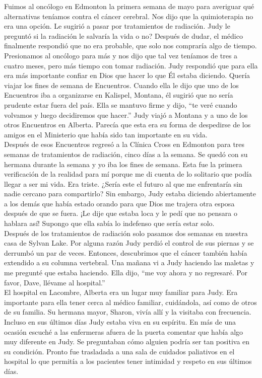\documentclass[twoside, 12pt]{book}
\begin{document}
Fuimos al oncólogo en Edmonton la primera semana de mayo para averiguar qué alternativas teníamos contra el cáncer cerebral. Nos dijo que la quimioterapia no era una opción. Le sugirió a pasar por tratamientos de radiación. Judy le preguntó si la radiación le salvaría la vida o no? Después de dudar, el médico finalmente respondió que no era probable, que solo nos compraría algo de tiempo. Presionamos al oncólogo para más y nos dijo que tal vez teníamos de tres a cuatro meses, pero más tiempo con tomar radiación. Judy respondió que para ella era más importante confiar en Dios que hacer lo que Él estaba diciendo. Quería viajar los fines de semana de Encuentros. Cuando ella le dijo que uno de los Encuentros iba a organizarse en Kalispel, Montana, él sugirió que no sería prudente estar fuera del país. Ella se mantuvo firme y dijo, “te veré cuando volvamos y luego decidiremos que hacer.” Judy viajó a Montana y a uno de los otros Encuentros en Alberta. Parecía que esta era su forma de despedirse de los amigos en el Ministerio que había sido tan importante en su vida.\\
 
Después de esos Encuentros regresó a la Clínica Cross en Edmonton para tres semanas de tratamientos de radiación, cinco días a la semana. Se quedó con su hermana durante la semana y yo iba los fines de semana. Esta fue la primera verificación de la realidad para mí porque me di cuenta de lo solitario que podía llegar a ser mi vida. Era triste. ¿Sería este el futuro al que me enfrentaría sin nadie cercano para compartirlo? Sin embargo, Judy estaba diciendo abiertamente a los demás que había estado orando para que Dios me trajera otra esposa después de que se fuera. ¡Le dije que estaba loca y le pedí que no pensara o hablara así!  Supongo que ella sabía lo indefenso que sería estar solo.\\
 
Después de los tratamientos de radiación solo pasamos dos semanas en nuestra casa de Sylvan Lake. Por alguna razón Judy perdió el control de sus piernas y se derrumbó un par de veces. Entonces, descubrimos que el cáncer también había extendido a su columna vertebral. Una mañana vi a Judy haciendo las maletas y me pregunté que estaba haciendo. Ella dijo, “me voy ahora y no regresaré.  Por favor, Dave, llévame al hospital.”\\
 
El hospital en Lacombre, Alberta era un lugar muy familiar para Judy.  Era importante para ella tener cerca al médico familiar, cuidándola, así como de otros de su familia.  Su hermana mayor, Sharon, vivía allí y la visitaba con frecuencia.  Incluso en sus últimos días Judy estaba viva en su espíritu.  En más de una ocasión escuché a las enfermeras afuera de la puerta comentar que había algo muy diferente en Judy. Se preguntaban cómo alguien podría ser tan positiva en su condición. Pronto fue trasladada a una sala de cuidados paliativos en el hospital lo que permitía a los pacientes tener intimidad y respeto en sus últimos días.\\
 
\end{document}
